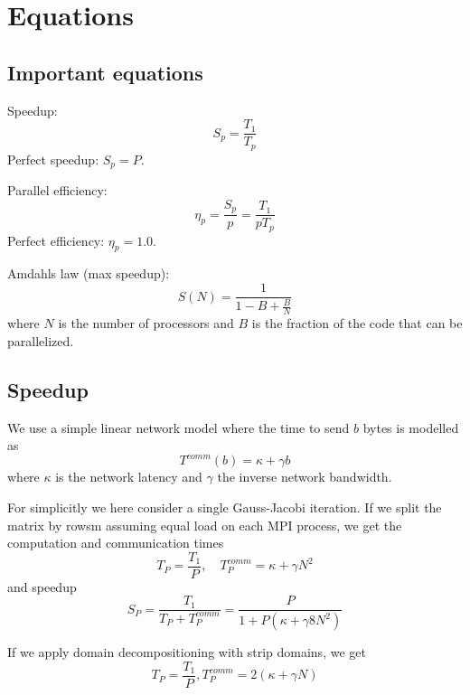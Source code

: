 
\section{Equations} %
\label{sec:equations}

\subsection{Important equations} %
\label{sub:important_equations}
Speedup:
\begin{equation}
  S_p = \frac{T_1}{T_p}
\end{equation}
Perfect speedup: $S_p = P$.

Parallel efficiency:
\begin{equation}
  \eta_p = \frac{S_p}{p} = \frac{T_1}{pT_p}
\end{equation}
Perfect efficiency: $\eta_p = 1.0$.

Amdahls law (max speedup):
\begin{equation}
  S(N) = \frac{1}{1-B + \frac{B}{N}}
\end{equation}
where $N$ is the number of processors and $B$ is the fraction of the code that can be parallelized.

\subsection{Speedup} %
\label{sub:speedup}

We use a simple linear network model where the time to send $b$ bytes is modelled as
\begin{equation}
  T^{comm}(b) = \kappa + \gamma b
\end{equation}
where $\kappa$ is the network latency and $\gamma$ the inverse network bandwidth.

For simplicitly we here consider a single Gauss-Jacobi iteration. If we split the matrix by rowsm assuming equal load on each MPI process, we get the computation and communication times
\begin{equation}
  T_P = \frac{T_1}{P}, \quad T_P^{comm} = \kappa + \gamma N^2
\end{equation}
and speedup
\begin{equation}
  S_P = \frac{T_1}{T_P+T_P^{comm}} = \frac{P}{1+P(\kappa + \gamma 8N^2)}
\end{equation}

If we apply domain decompositioning with strip domains, we get
\begin{equation}
  T_P = \frac{T_1}{P}, T_P^{comm} = 2 (\kappa + \gamma N)
\end{equation}


